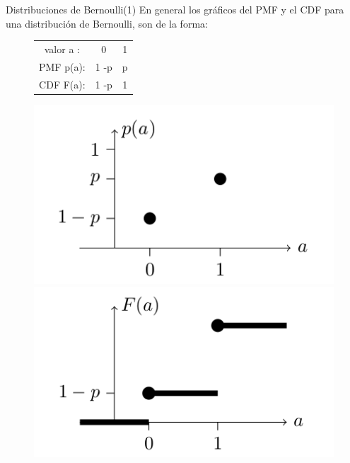 \documentclass[10pt]{beamer}
\begin{document}
\begin{frame}{Distribuciones de Bernoulli(1)}
En general los gr\'aficos del PMF y el CDF para una distribuci\'on de Bernoulli, son de la forma:

\begin{figure}
	\centering
	\begin{minipage}{.5\textwidth}
		\begin{table}[]
			\centering
			\begin{tabular}{ccc}
				valor  a  :    & 0    & 1    \\
				PMF   p(a): & 1 -p &  p     \\
				CDF   F(a):& 1 -p  &  1	
			\end{tabular}
		\end{table}
	\end{minipage}%
	\begin{minipage}{.3\textwidth}
		\centering
		\includegraphics[width=1.2\linewidth]{v11}
	\end{minipage}
	\begin{minipage}{.3\textwidth}
		\centering
		\includegraphics[width=1.2\linewidth]{v12}
	\end{minipage}
\end{figure}
\end{frame}
\end{document}
